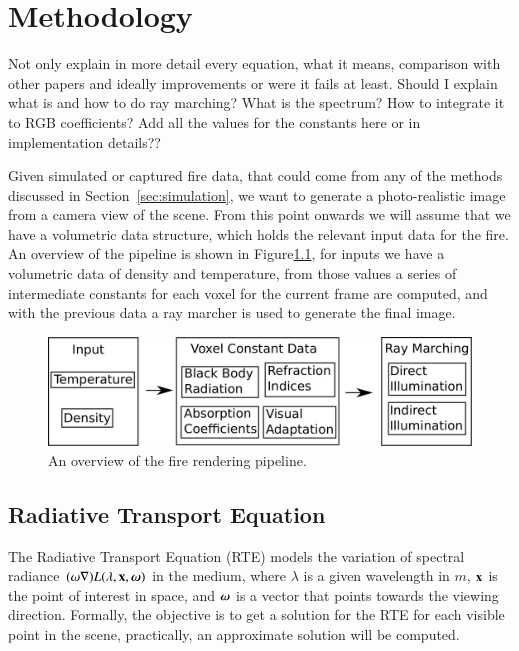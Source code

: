 \chapter{Methodology}
\label{ch:methodology}

Not only explain in more detail every equation, what it means, comparison with other papers and ideally improvements or were it fails at least.
Should I explain what is and how to do ray marching? What is the spectrum? How to integrate it to RGB coefficients?
Add all the values for the constants here or in implementation details??

Given simulated or captured fire data, that could come from any of the methods discussed in Section~\ref{sec:simulation}, we want to generate a photo-realistic image from a camera view of the scene.
From this point onwards we will assume that we have a volumetric data structure, which holds the relevant input data for the fire.
An overview of the pipeline is shown in Figure\ref{fig:pipeline}, for inputs we have a volumetric data of density and temperature, from those values a series of intermediate constants for each voxel for the current frame are computed, and with the previous data a ray marcher is used to generate the final image.

\begin{figure}[htbp!]
	\centering
	\includegraphics[width=\textwidth]{img/pipeline}
	\caption{An overview of the fire rendering pipeline.}
	\label{fig:pipeline}
\end{figure}

\section{Radiative Transport Equation}
\label{sec:radiative_transport_equation}

The Radiative Transport Equation (RTE) \cite{Howell:2002} models the variation of spectral radiance $(\omega \nabla) L(\lambda, \mathbf{x}, \boldsymbol{\omega})$ in the medium, where $\lambda$ is a given wavelength in $m$, $\mathbf{x}$ is the point of interest in space, and $\boldsymbol{\omega}$ is a vector that points towards the viewing direction.
Formally, the objective is to get a solution for the RTE for each visible point in the scene, practically, an approximate solution will be computed.

